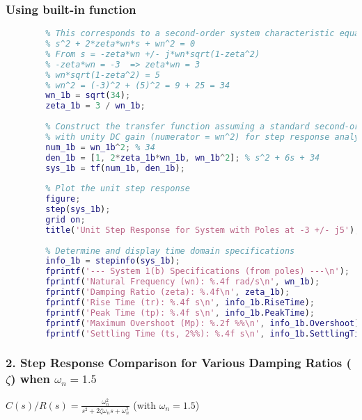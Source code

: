 \documentclass[a4paper,12pt]{article}
\begin{document}
	\subsubsection{Using built-in function}
	\begin{lstlisting}[language=Matlab, caption=MATLAB Code for Problem 1(b)]
		% Given pole: S = -3 - j5. This implies a conjugate pair: -3 +/- j5.
		% This corresponds to a second-order system characteristic equation:
		% s^2 + 2*zeta*wn*s + wn^2 = 0
		% From s = -zeta*wn +/- j*wn*sqrt(1-zeta^2)
		% -zeta*wn = -3  => zeta*wn = 3
		% wn*sqrt(1-zeta^2) = 5
		% wn^2 = (-3)^2 + (5)^2 = 9 + 25 = 34
		wn_1b = sqrt(34);
		zeta_1b = 3 / wn_1b;
		
		% Construct the transfer function assuming a standard second-order system
		% with unity DC gain (numerator = wn^2) for step response analysis
		num_1b = wn_1b^2; % 34
		den_1b = [1, 2*zeta_1b*wn_1b, wn_1b^2]; % s^2 + 6s + 34
		sys_1b = tf(num_1b, den_1b);
		
		% Plot the unit step response
		figure;
		step(sys_1b);
		grid on;
		title('Unit Step Response for System with Poles at -3 +/- j5');
		
		% Determine and display time domain specifications
		info_1b = stepinfo(sys_1b);
		fprintf('--- System 1(b) Specifications (from poles) ---\n');
		fprintf('Natural Frequency (wn): %.4f rad/s\n', wn_1b);
		fprintf('Damping Ratio (zeta): %.4f\n', zeta_1b);
		fprintf('Rise Time (tr): %.4f s\n', info_1b.RiseTime);
		fprintf('Peak Time (tp): %.4f s\n', info_1b.PeakTime);
		fprintf('Maximum Overshoot (Mp): %.2f %%\n', info_1b.Overshoot);
		fprintf('Settling Time (ts, 2%%): %.4f s\n', info_1b.SettlingTime);
	\end{lstlisting}
	
	\subsubsection*{2. Step Response Comparison for Various Damping Ratios ($\zeta$) when $\omega_n = 1.5$}
	$C(s)/R(s) = \frac{\omega_n^2}{s^2 + 2\zeta\omega_n s + \omega_n^2}$ (with $\omega_n = 1.5$)
	
\end{document}
